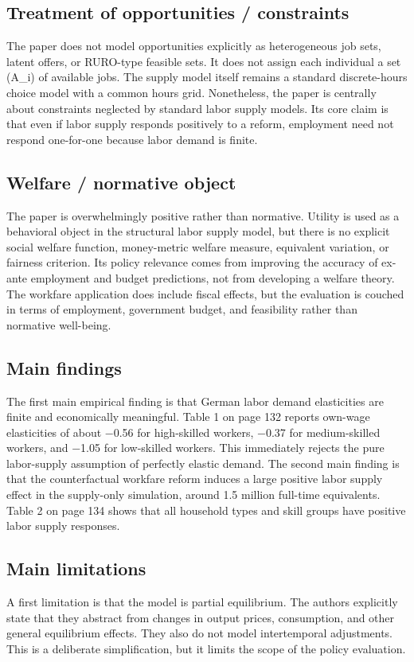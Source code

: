 \documentclass[11pt,a4paper]{article}
\begin{document}
\subsection*{Treatment of opportunities / constraints}
The paper does not model opportunities explicitly as heterogeneous job sets, latent offers, or RURO-type feasible sets. It does not assign each individual a set (A\_i) of available jobs. The supply model itself remains a standard discrete-hours choice model with a common hours grid. Nonetheless, the paper is centrally about constraints neglected by standard labor supply models. Its core claim is that even if labor supply responds positively to a reform, employment need not respond one-for-one because labor demand is finite.

\subsection*{Welfare / normative object}
The paper is overwhelmingly positive rather than normative. Utility is used as a behavioral object in the structural labor supply model, but there is no explicit social welfare function, money-metric welfare measure, equivalent variation, or fairness criterion. Its policy relevance comes from improving the accuracy of ex-ante employment and budget predictions, not from developing a welfare theory. The workfare application does include fiscal effects, but the evaluation is couched in terms of employment, government budget, and feasibility rather than normative well-being.

\subsection*{Main findings}
The first main empirical finding is that German labor demand elasticities are finite and economically meaningful. Table 1 on page 132 reports own-wage elasticities of about −0.56 for high-skilled workers, −0.37 for medium-skilled workers, and −1.05 for low-skilled workers. This immediately rejects the pure labor-supply assumption of perfectly elastic demand. The second main finding is that the counterfactual workfare reform induces a large positive labor supply effect in the supply-only simulation, around 1.5 million full-time equivalents. Table 2 on page 134 shows that all household types and skill groups have positive labor supply responses.

\subsection*{Main limitations}
A first limitation is that the model is partial equilibrium. The authors explicitly state that they abstract from changes in output prices, consumption, and other general equilibrium effects. They also do not model intertemporal adjustments. This is a deliberate simplification, but it limits the scope of the policy evaluation.
\end{document}
